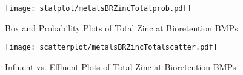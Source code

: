         \begin{figure}[hb]   %
            \centering
            \texttt{[image: statplot/metalsBRZincTotalprob.pdf]}
            \caption{Box and Probability Plots of Total Zinc at Bioretention BMPs}
        \end{figure}         %
        
        
        \begin{figure}[hb]   %
            \centering
            \texttt{[image: scatterplot/metalsBRZincTotalscatter.pdf]}
            \caption{Influent vs. Effluent Plots of Total Zinc at Bioretention BMPs}
        \end{figure}         %
        \clearpage
        